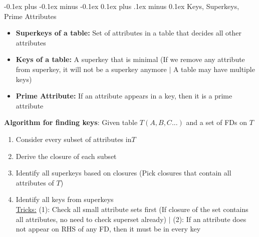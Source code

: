 \documentclass[landscape]{article}
\makeatletter
\renewcommand{\subsection}{\@startsection{subsection}{2}{0mm}%
  {-0.1ex plus -0.1ex minus -0.1ex}%
  {0.1ex plus .1ex minus 0.1ex}%
{\normalfont\scriptsize\bfseries}}
\makeatother
\begin{document}
\begin{multicols*}{5}
    \subsection{Keys, Superkeys, Prime Attributes}
    \begin{itemize}
      \item \textbf{Superkeys of a table:} Set of attributes in a table that decides all other attributes
      \item \textbf{Keys of a table:} A superkey that is minimal (If we remove any attribute from superkey, it will not be a superkey anymore $\vert$ A table may have multiple keys)
      \item \textbf{Prime Attribute:} If an attribute appears in a key, then it is a prime attribute
    \end{itemize}
    \textbf{Algorithm for finding keys}: Given table $T(A,B,C...)$ and a set of FDs on $T$
    \begin{enumerate}
      \item Consider every subset of attributes in$T$
      \item Derive the closure of each subset
      \item Identify all superkeys based on closures (Pick closures that contain all attributes of $T$)
      \item Identify all keys from superkeys
      \\ \underline{Tricks:} (1): Check all small attribute sets first (If closure of the set contains all attributes, no need to check superset already) $\vert$ (2): If an attribute does not appear on RHS of any FD, then it must be in every key
    \end{enumerate}
  \end{multicols*}
\end{document}
